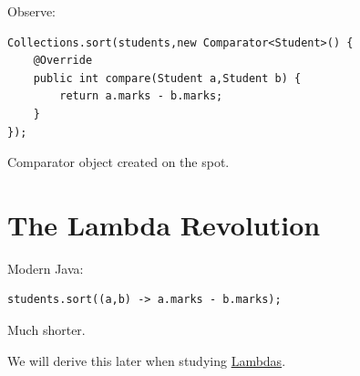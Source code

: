 \documentclass[11pt,a4paper]{book}
\begin{document}
Observe:

\begin{verbatim} 
Collections.sort(students,new Comparator<Student>() {
    @Override
    public int compare(Student a,Student b) {
        return a.marks - b.marks;
    }
});
\end{verbatim}


Comparator object created
on the spot.


\section{The Lambda Revolution}\label{sec:lambda_ref}

Modern Java:

\begin{verbatim} 
students.sort((a,b) -> a.marks - b.marks);
\end{verbatim}


Much shorter.


We will derive this later
when studying \hyperref[sec:lambda_syntax]{Lambdas}.












\end{document}
